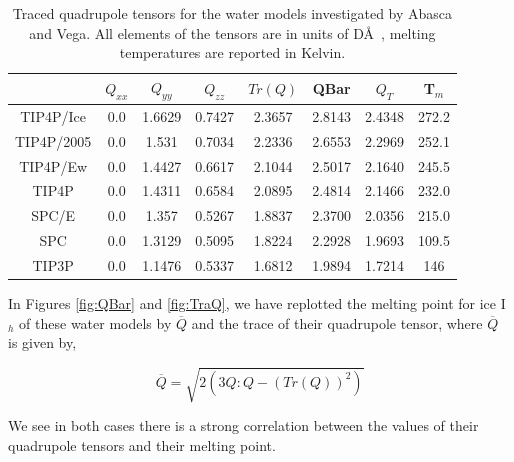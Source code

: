 \begin{table}[h!]
\begin{tabular}{|c|c|c|c|c|c|c|c|}
\hline
& $Q_{xx}$ & $Q_{yy}$ & $Q_{zz}$ & $Tr(Q)$ & QBar & $Q_{T}$ & T$_{m}$ \\
\hline
TIP4P/Ice & 0.0 & 1.6629 & 0.7427 & 2.3657 & 2.8143 & 2.4348  & 272.2 \\
TIP4P/2005 & 0.0 & 1.531 & 0.7034 & 2.2336 & 2.6553 & 2.2969  & 252.1 \\
TIP4P/Ew & 0.0 & 1.4427 & 0.6617 & 2.1044  & 2.5017 & 2.1640  & 245.5   \\
TIP4P & 0.0 & 1.4311 & 0.6584 & 2.0895 & 2.4814 & 2.1466 & 232.0 \\
SPC/E & 0.0 & 1.357 & 0.5267 & 1.8837 & 2.3700 & 2.0356 & 215.0 \\
SPC & 0.0 & 1.3129 & 0.5095 & 1.8224 & 2.2928 & 1.9693 & 109.5 \\
TIP3P & 0.0 & 1.1476 & 0.5337 & 1.6812 & 1.9894 & 1.7214 & 146 \\
\hline
\end{tabular}
\caption{Traced quadrupole tensors for the water models investigated by Abasca and Vega. All elements of the tensors are in units of D\AA~, melting temperatures are reported in Kelvin.}
\label{Models_quad}
\end{table} 

In Figures \ref{fig:QBar} and \ref{fig:TraQ},
we have replotted the 
melting point for ice I$_h$ of these water models by $\overline{Q}$ and the 
trace of their
quadrupole tensor, where $\overline{Q}$ is given by,

\begin{equation}
\overline{Q} = \sqrt{2(3 Q:Q - (Tr(Q))^{2})}
\end{equation}

We see in both cases there is a strong correlation between
the values of their quadrupole tensors and their melting point.


